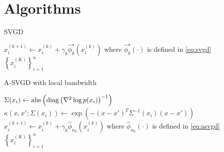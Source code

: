 





\section{Algorithms}

\begin{algorithm}[H] 
    \caption{SVGD} \label{alg:SVGD} 
\begin{algorithmic}
        \State $x_{i}^{(k+1)} \leftarrow x_{i}^{(k)}+ \gamma_k \hat{\phi}_k^{\star}\left(x_{i}^{(k)}\right)$ where $\hat{\phi}_k^{\star}(\cdot)$ is defined in \cref{eq:svgd}
        \EndFor
    \EndFor
    \State \Return $\left\{x_i^{(K)}  \right\}_{i = 1}^n$ 
   \EndProcedure 
\end{algorithmic}
\end{algorithm}

\begin{algorithm}[H] 
    \caption{A-SVGD with local bandwidth} \label{alg:ASVGD_bw} 
\begin{algorithmic}
        \State $\Sigma(x_i) \gets \text{abs}\left( \operatorname{diag} \left(\nabla^2 \log p(x_i) \right)^{-1}\right)$
        \State $\kappa(x, x'; \Sigma(x_i))\gets \exp(-(x - x')^T \Sigma^{-1}(x_i)(x- x')  )$
        \State $x_{i}^{(k+1)} \leftarrow x_{i}^{(k)}+ \gamma_k \hat{\phi}_{\alpha_k}\left(x_{i}^{(k)}\right)$ where $\hat{\phi}_{\alpha_k}(\cdot)$ is defined in \cref{eq:asvgd}
        \EndFor
    \EndFor
    \State \Return $\left\{x_i^{(K)}  \right\}_{i = 1}^n$ 
   \EndProcedure 
\end{algorithmic}
\end{algorithm}




